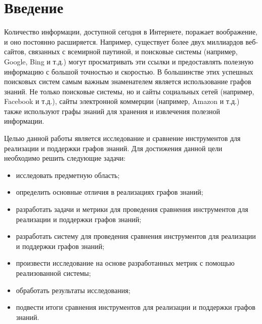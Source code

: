 \chapter*{Введение} %

Количество информации, доступной сегодня в Интернете, поражает воображение, и оно постоянно расширяется. Например, существует более двух миллиардов веб-сайтов, связанных с всемирной паутиной, и поисковые системы (например, Google, Bing и т.д.) могут просматривать эти ссылки и предоставлять полезную информацию с большой точностью и скоростью. В большинстве этих успешных поисковых систем самым важным знаменателем является использование графов знаний. Не только поисковые системы, но и сайты социальных сетей (например, Facebook и т.д.), сайты электронной коммерции (например, Amazon и т.д.) также используют графы знаний для хранения и извлечения полезной информации.

Целью данной работы является исследование и сравнение инструментов для реализации и поддержки графов знаний. Для достижения данной цели необходимо решить следующие задачи:

\begin{itemize}
    \item исследовать предметную область;
    \item определить основные отличия в реализациях графов знаний;
    \item разработать задачи и метрики для проведения сравнения инструментов для реализации и поддержки графов знаний;
    \item разработать систему для проведения сравнения инструментов для реализации и поддержки графов знаний;
    \item произвести исследование на основе разработанных метрик с помощью реализованной системы;
    \item обработать результаты исследования;
    \item подвести итоги сравнения инструментов для реализации и поддержки графов знаний.
\end{itemize}

